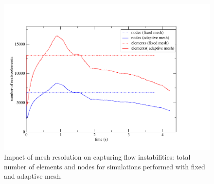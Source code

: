 \begin{figure}[ht] 
\includegraphics[width=\textwidth]{./Pics1/Section4_4/Five_regions_adapt_PlotTimeNodesElements.pdf}
\caption{Impact of mesh resolution on capturing flow instabilities: total number of elements and nodes for simulations performed with fixed and adaptive mesh. }
\label{fig:5regions_plottimenodeselements}
\end{figure}



